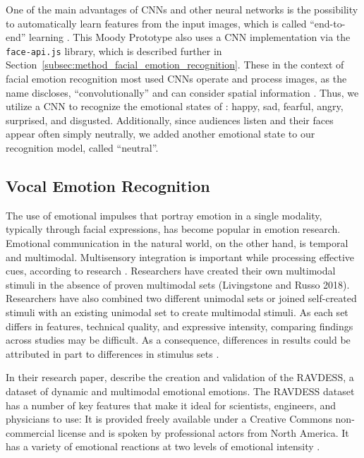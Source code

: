 One of the main advantages of CNNs and other neural networks is the possibility to automatically learn features from the input images, which is called ``end-to-end'' learning \cite{ko_brief_2018}. This Moody Prototype also uses a CNN implementation via the \texttt{face-api.js} library, which is described further in Section~\ref{subsec:method_facial_emotion_recognition}. These in the context of facial emotion recognition most used CNNs operate and process images, as the name discloses, ``convolutionally'' and can consider spatial information \cite{ko_brief_2018, rosler_reducing_2021}. Thus, we utilize a CNN to recognize the emotional states of : happy, sad, fearful, angry, surprised, and disgusted. Additionally, since audiences listen and their faces appear often simply neutrally, we added another emotional state to our recognition model, called ``neutral''.

\subsection{Vocal Emotion Recognition}
\label{subsec:related_work_vocal_emotion_recognition}
The use of emotional impulses that portray emotion in a single modality, typically through facial expressions, has become popular in emotion research. Emotional communication in the natural world, on the other hand, is temporal and multimodal. Multisensory integration is important while processing effective cues, according to research \cite{livingstone_ryerson_2018}. Researchers have created their own multimodal stimuli in the absence of proven multimodal sets (Livingstone and Russo 2018). Researchers have also combined two different unimodal sets \cite{delle-vigne_subclinical_2014} or joined self-created stimuli with an existing unimodal set \cite{zvyagintsev_attention_2013} to create multimodal stimuli. As each set differs in features, technical quality, and expressive intensity, comparing findings across studies may be difficult. As a consequence, differences in results could be attributed in part to differences in stimulus sets \cite{livingstone_ryerson_2018}.

In their research paper,  describe the creation and validation of the RAVDESS, a dataset of dynamic and multimodal emotional emotions. The RAVDESS dataset has a number of key features that make it ideal for scientists, engineers, and physicians to use: It is provided freely available under a Creative Commons non-commercial license and is spoken by professional actors from North America. It has a variety of emotional reactions at two levels of emotional intensity \cite{livingstone_ryerson_2018}. 

